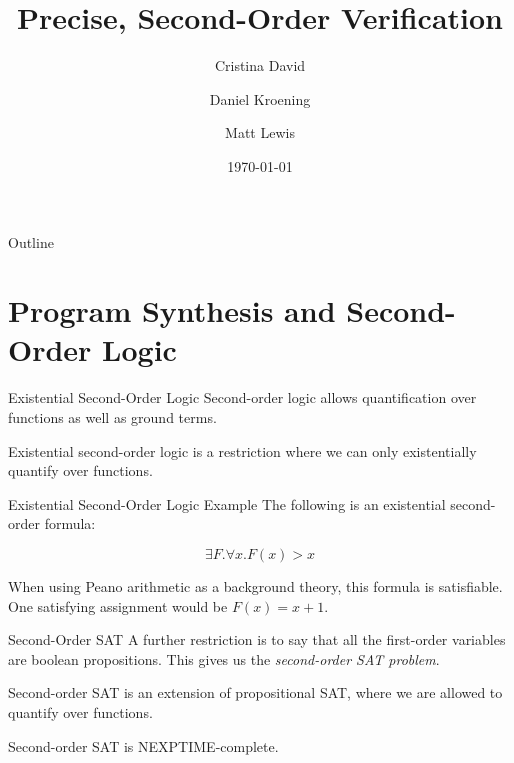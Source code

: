 \documentclass[xcolor=pdftex,t,11pt]{beamer}
\author{Cristina David \and Daniel Kroening \and Matt Lewis}
\title{Precise, Second-Order Verification}
\institute{Oxford University}
\date{\today}
\begin{document}

\begin{frame}[plain]
  \titlepage
\end{frame}

\begin{frame}{Outline}
  \tableofcontents
\end{frame}


\section{Program Synthesis and Second-Order Logic}

\begin{frame}{Existential Second-Order Logic}
 Second-order logic allows quantification over functions as well as ground terms.
 
 \vspace{1em}
 
 Existential second-order logic is a restriction where we can only existentially quantify over functions.
 
\end{frame}

\begin{frame}{Existential Second-Order Logic Example}
The following is an existential second-order formula:

 \[
  \exists F . \forall x . F(x) > x
 \]

 When using Peano arithmetic as a background theory, this formula is satisfiable.  One satisfying assignment would be $F(x) = x + 1$.
\end{frame}

\begin{frame}{Second-Order SAT}
 A further restriction is to say that all the first-order variables are boolean propositions.  This
 gives us the \emph{second-order SAT problem}.

 \vspace{1em}

 Second-order SAT is an extension of propositional SAT, where we are allowed to quantify
 over functions.
 
 \vspace{1em}
 
 Second-order SAT is NEXPTIME-complete.
\end{frame}
\end{document}
